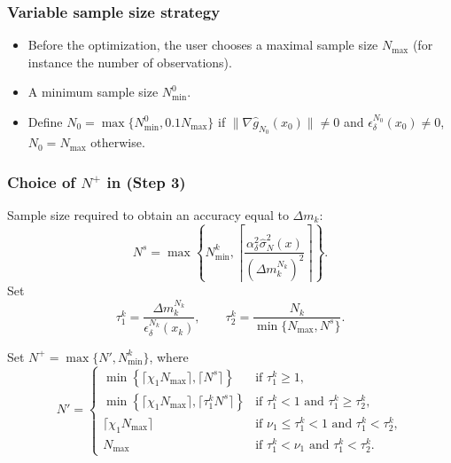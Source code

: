 \documentclass{beamer}
\begin{document}
\begin{frame}
\frametitle{Variable sample size strategy}										

\begin{itemize}
	\item 
Before the optimization, the user chooses a maximal sample size $N_{\max}$ (for instance the number of observations).
	\item 
A minimum sample size $N^0_{\min}$. %
\item
Define $N_0 = \max\lbrace N^0_{\min}, 0.1N_{\max}\rbrace$ if $\| \nabla \hat{g}_{N_0}(x_0) \| \ne 0$ and $\epsilon_{\delta}^{N_0}(x_0) \ne 0$, $N_0 = N_{\max}$ otherwise.
\end{itemize}

\end{frame}

\begin{frame}
\frametitle{Choice of $N^+$ in (Step 3)}										

Sample size required to obtain an accuracy equal to $\Delta m_k$:
\[
N^s = \max \left\lbrace N^k_{\min},
\left\lceil
\frac{\alpha^2_{\delta}  \hat{\sigma}^2_N(x)}{(\Delta m_k^{N_k})^2}
\right\rceil \right\rbrace.
\]
Set
$$
\tau_1^k = \frac{\Delta m_k^{N_k}}{\epsilon_\delta^{N_k} (x_k)},\qquad
\tau_2^k = \frac{N_k}{\min \lbrace N_{\max}, N^s \rbrace}.
$$

Set $N^+ = \max\lbrace N', N^k_{\min}\rbrace$, where
$$
N' =
\begin{cases}
	\min \left\lbrace \lceil \chi_1 N_{\max} \rceil, \lceil N^s
	\rceil \right\rbrace & \text{if } \tau_1^k \geq 1, \\
	\min \left\lbrace \lceil \chi_1 N_{\max} \rceil, \lceil \tau_1^kN^s
	\rceil  \right\rbrace &  \text{if } \tau_1^k < 1 \text{ and }
	\tau_1^k \geq  \tau_2^k,\\
	\lceil \chi_1 N_{\max} \rceil & \text{if }  \nu_1 \leq \tau_1^k <
	1\text{ and }\tau_1^k < \tau_2^k,\\
	N_{\max} & \text{if } \tau_1^k < \nu_1\text{ and }\tau_1^k < \tau_2^k.
\end{cases}
$$


\end{frame}
\end{document}
